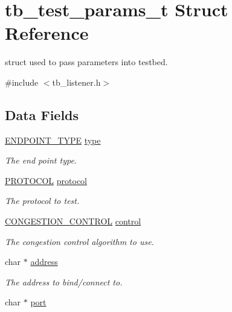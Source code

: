 \hypertarget{structtb__test__params__t}{\section{tb\-\_\-test\-\_\-params\-\_\-t Struct Reference}
\label{structtb__test__params__t}
}


struct used to pass parameters into testbed.  




{\ttfamily \#include $<$tb\-\_\-listener.\-h$>$}

\subsection*{Data Fields}
\begin{DoxyCompactItemize}
\item 
\hyperlink{tb__listener_8h_ae37f3ebcf0081b2dd11adf41f1f867d6}{E\-N\-D\-P\-O\-I\-N\-T\-\_\-\-T\-Y\-P\-E} \hyperlink{structtb__test__params__t_a3fefae1824d77098e05df5bac09c1791}{type}
\begin{DoxyCompactList}\small\item\em The end point type. \end{DoxyCompactList}\item 
\hyperlink{tb__protocol_8h_a7a5bff1040fc154c510874327d44cc1a}{P\-R\-O\-T\-O\-C\-O\-L} \hyperlink{structtb__test__params__t_a0d2276cd987e688180eedab183cd503e}{protocol}
\begin{DoxyCompactList}\small\item\em The protocol to test. \end{DoxyCompactList}\item 
\hyperlink{tb__protocol_8h_ac5355051296d54a114b8691ccfc4010c}{C\-O\-N\-G\-E\-S\-T\-I\-O\-N\-\_\-\-C\-O\-N\-T\-R\-O\-L} \hyperlink{structtb__test__params__t_a50b4d1da7c10bfd1e9365a1c37d09442}{control}
\begin{DoxyCompactList}\small\item\em The congestion control algorithm to use. \end{DoxyCompactList}\item 
char $\ast$ \hyperlink{structtb__test__params__t_a879a8cdf605d02f8af8b2e216b8764f2}{address}
\begin{DoxyCompactList}\small\item\em The address to bind/connect to. \end{DoxyCompactList}\item 
char $\ast$ \hyperlink{structtb__test__params__t_add99ba4ea70b8f66170823cad9a55fa4}{port}

\end{DoxyCompactItemize}
